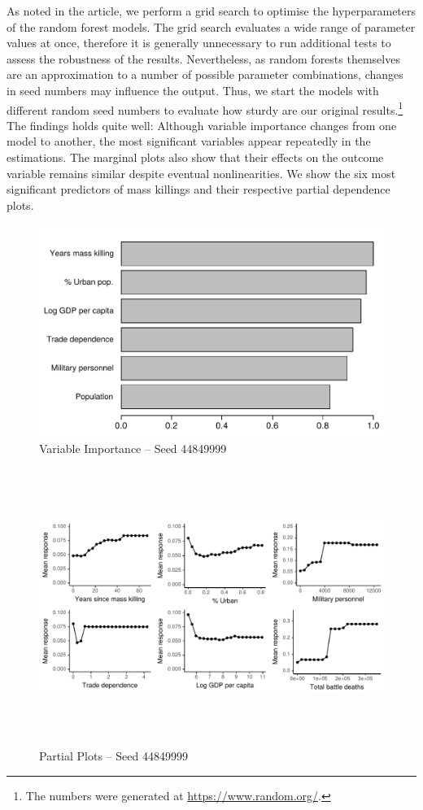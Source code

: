 \documentclass[a4paper,12pt]{article}
\begin{document}
As noted in the article, we perform a grid search to optimise the hyperparameters of the random forest models. The grid search evaluates a wide range of parameter values at once, therefore it is generally unnecessary to run additional tests to assess the robustness of the results. Nevertheless, as random forests themselves are an approximation to a number of possible parameter combinations, changes in seed numbers may influence the output. Thus, we start the models with different random seed numbers to evaluate how sturdy are our original results.\footnote{The numbers were generated at \href{https://www.random.org/}{https://www.random.org/}.} The findings holds quite well: Although variable importance changes from one model to another, the most significant variables appear repeatedly in the estimations. The marginal plots also show that their effects on the outcome variable remains similar despite eventual nonlinearities. We show the six most significant predictors of mass killings and their respective partial dependence plots.

\begin{figure}[H]
    \centering
    \includegraphics{images/drf-mk2.pdf}
    \caption{Variable Importance -- Seed 44849999}
    \label{fig:my_label}
\end{figure}

\begin{figure}[H]
    \centering
    \includegraphics[width=\textwidth, height=9cm]{images/drfdpp2.pdf}
    \caption{Partial Plots -- Seed 44849999}
    \label{fig:my_label}
\end{figure}
\end{document}
